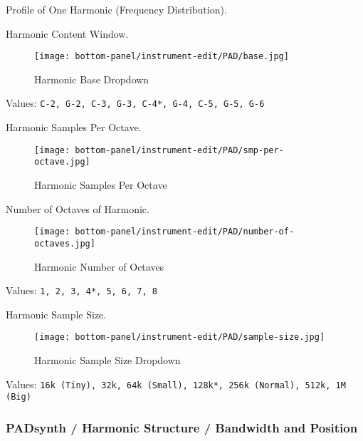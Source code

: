    \setcounter{ItemCounter}{0}      %

   Profile of One Harmonic (Frequency Distribution).

   Harmonic Content Window.


\begin{figure}[H]
   \centering
   \texttt{[image: bottom-panel/instrument-edit/PAD/base.jpg]}
   \caption{Harmonic Base Dropdown}
   \label{fig:padsynth_harmonic_base_dropdown}
\end{figure}

   Values: \texttt{C-2, G-2, C-3, G-3, C-4*, G-4, C-5, G-5, G-6}

   Harmonic Samples Per Octave.

\begin{figure}[H]
   \centering
   \texttt{[image: bottom-panel/instrument-edit/PAD/smp-per-octave.jpg]}
   \caption{Harmonic Samples Per Octave}
   \label{fig:padsynth_harmonic_samples_per_octave}
\end{figure}

   Number of Octaves of Harmonic.

\begin{figure}[H]
   \centering
   \texttt{[image: bottom-panel/instrument-edit/PAD/number-of-octaves.jpg]}
   \caption{Harmonic Number of Octaves}
   \label{fig:padsynth_harmonic_number_of_octaves}
\end{figure}

   Values: \texttt{1, 2, 3, 4*, 5, 6, 7, 8}

   Harmonic Sample Size.

\begin{figure}[H]
   \centering
   \texttt{[image: bottom-panel/instrument-edit/PAD/sample-size.jpg]}
   \caption{Harmonic Sample Size Dropdown}
   \label{fig:padsynth_harmonic_sample_size_dropdown}
\end{figure}

   Values: \texttt{16k (Tiny), 32k, 64k (Small), 128k*, 256k (Normal), 512k, 1M (Big)}

\subsubsection{PADsynth / Harmonic Structure / Bandwidth and Position}
\label{subsubsec:padsynth_harmonic_structure_bw_and_pos}

